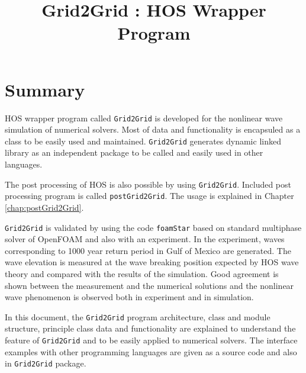 

\title{Grid2Grid : HOS Wrapper Program }



	

	\tableofcontents	

	
	
	

		    

		    	

		
		
			

		

	
	
	
		
	\pagebreak
	\section{Summary}
	
	HOS wrapper program called \texttt{Grid2Grid} is developed for the nonlinear wave simulation of numerical solvers. Most of data and functionality is encapsuled as a class to be easily used and maintained. \texttt{Grid2Grid} generates dynamic linked library as an independent package to be called and easily used in other languages. 
	
	The post processing of HOS is also possible by using \texttt{Grid2Grid}. Included post processing program is called \texttt{postGrid2Grid}. The usage is explained in Chapter \ref{chap:postGrid2Grid}.
	
	\texttt{Grid2Grid} is validated by using the code \texttt{foamStar} based on standard multiphase solver of OpenFOAM and also with an experiment. In the experiment, waves corresponding to 1000 year return period in Gulf of Mexico are generated. The wave elevation is measured at the wave breaking position expected by HOS wave theory and compared with the results of the simulation. Good agreement is shown between the measurement and the numerical solutions and the nonlinear wave phenomenon is observed both in experiment and in simulation. 
	
	In this document, the \texttt{Grid2Grid} program architecture, class and module structure, principle class data and functionality are explained to understand the feature of \texttt{Grid2Grid} and to be easily applied to numerical solvers. The interface examples with other programming languages are given as a source code and also in \texttt{Grid2Grid} package. 	
	

	\pagebreak
	

	


